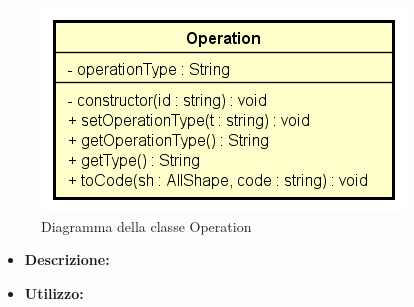\begin{figure}[h!]
	\centering
	\includegraphics[scale=0.8]{res/sections/SpecificaFrontEnd/Services/Disegnetti/operation.png}
	\caption{Diagramma della classe Operation}
\end{figure}

\begin{itemize}
	\item \textbf{Descrizione:}\\
	
	\item \textbf{Utilizzo:}\\
	

\end{itemize}
